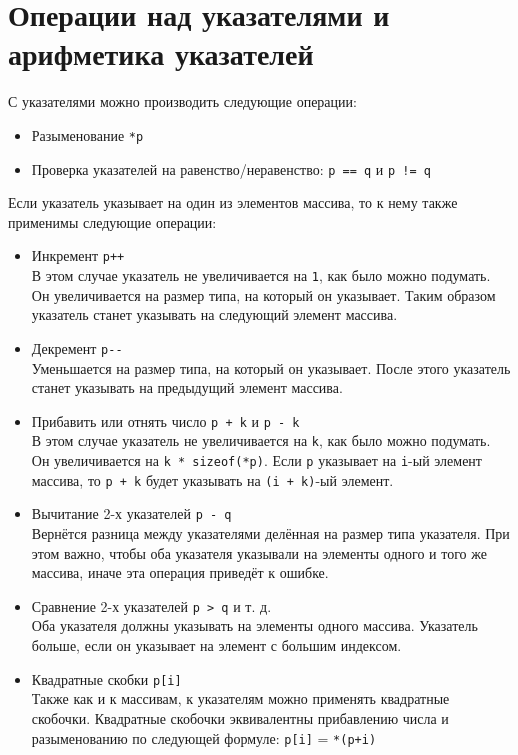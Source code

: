 \documentclass{article}
\begin{document}
\section*{Операции над указателями и арифметика указателей}
С указателями можно производить следующие операции:
\begin{itemize}
\item Разыменование \texttt{*p}
\item Проверка указателей на равенство/неравенство: \texttt{p == q} и \texttt{p != q}
\end{itemize}
Если указатель указывает на один из элементов массива, то к нему также применимы следующие операции:
\begin{itemize}
\item Инкремент \texttt{p++}\\
В этом случае указатель не увеличивается на \texttt{1}, как было можно подумать. Он увеличивается на размер типа, на который он указывает. Таким образом указатель станет указывать на следующий элемент массива.

\item Декремент \texttt{p-{}-}\\
Уменьшается на размер типа, на который он указывает. После этого указатель станет указывать на предыдущий элемент массива.

\item Прибавить или отнять число \texttt{p + k} и \texttt{p - k}\\
В этом случае указатель не увеличивается на \texttt{k}, как было можно подумать. Он увеличивается на \texttt{k * sizeof(*p)}. Если \texttt{p} указывает на \texttt{i}-ый элемент массива, то \texttt{p + k} будет указывать на \texttt{(i + k)}-ый элемент.

\item Вычитание 2-х указателей \texttt{p - q}\\
Вернётся разница между указателями делённая на размер типа указателя.
При этом важно, чтобы оба указателя указывали на элементы одного и того же массива, иначе эта операция приведёт к ошибке.

\item Сравнение 2-х указателей \texttt{p > q} и т. д.\\
Оба указателя должны указывать на элементы одного массива. Указатель больше, если он указывает на элемент с большим индексом.

\item Квадратные скобки \texttt{p[i]}\\
Также как и к массивам, к указателям можно применять квадратные скобочки. Квадратные скобочки эквивалентны прибавлению числа и разыменованию по следующей формуле: \texttt{p[i]} = \texttt{*(p+i)}
\end{itemize}
\end{document}
